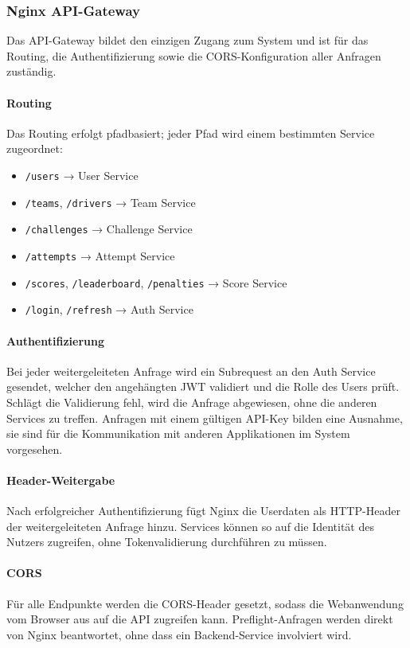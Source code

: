 \subsubsection{Nginx API-Gateway}
\label{sec:nginx}
Das \gls{API}-Gateway bildet den einzigen Zugang zum System und ist für das Routing,
die Authentifizierung sowie die CORS-Konfiguration aller Anfragen zuständig.

\paragraph{Routing}
Das Routing erfolgt pfadbasiert; jeder Pfad wird einem bestimmten 
Service zugeordnet:

\begin{itemize}
    \item \texttt{/users} → User Service
    \item \texttt{/teams}, \texttt{/drivers} → Team Service
    \item \texttt{/challenges} → Challenge Service
    \item \texttt{/attempts} → Attempt Service
    \item \texttt{/scores}, \texttt{/leaderboard}, \texttt{/penalties} → Score Service
    \item \texttt{/login}, \texttt{/refresh} → Auth Service
\end{itemize}

\paragraph{Authentifizierung}
Bei jeder weitergeleiteten Anfrage wird ein Subrequest an den Auth Service gesendet,
welcher den angehängten \gls{JWT} validiert und die Rolle des Users prüft.
Schlägt die Validierung fehl, wird die Anfrage abgewiesen, ohne die anderen
Services zu treffen. Anfragen mit einem gültigen \gls{API}-Key bilden eine Ausnahme,
sie sind für die Kommunikation mit anderen Applikationen im System vorgesehen.

\paragraph{Header-Weitergabe}
Nach erfolgreicher Authentifizierung fügt Nginx die Userdaten als HTTP-Header der weitergeleiteten Anfrage hinzu. 
Services können so auf die Identität des Nutzers zugreifen, ohne Tokenvalidierung durchführen zu müssen.

\paragraph{CORS}
Für alle Endpunkte werden die CORS-Header gesetzt, sodass die Webanwendung vom Browser 
aus auf die \gls{API} zugreifen kann. Preflight-Anfragen werden direkt von Nginx beantwortet, 
ohne dass ein Backend-Service involviert wird.


